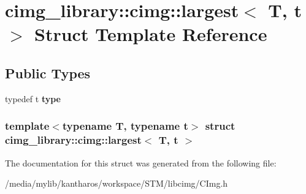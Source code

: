 \hypertarget{structcimg__library_1_1cimg_1_1largest}{
\section{cimg\_\-library::cimg::largest$<$ T, t $>$ Struct Template Reference}
\label{structcimg__library_1_1cimg_1_1largest}
}
\subsection*{Public Types}
\begin{DoxyCompactItemize}
\item 
\hypertarget{structcimg__library_1_1cimg_1_1largest_afb964e7866aca2ac2541e4cc20b7dfbb}{
typedef t {\bfseries type}}
\label{structcimg__library_1_1cimg_1_1largest_afb964e7866aca2ac2541e4cc20b7dfbb}

\end{DoxyCompactItemize}
\subsubsection*{template$<$typename T, typename t$>$ struct cimg\_\-library::cimg::largest$<$ T, t $>$}



The documentation for this struct was generated from the following file:\begin{DoxyCompactItemize}
\item 
/media/mylib/kantharos/workspace/STM/libcimg/CImg.h\end{DoxyCompactItemize}
